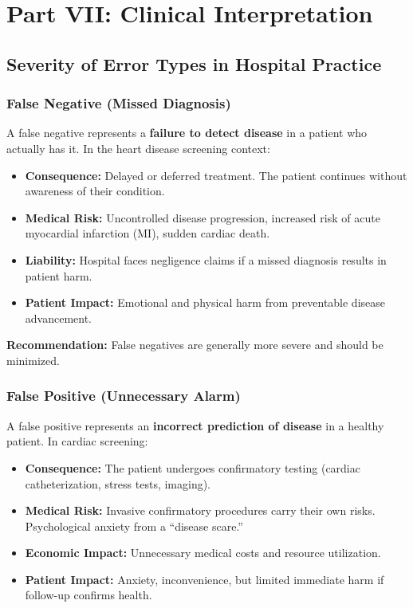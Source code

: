 \documentclass[11pt]{article}
\begin{document}
\newpage

\section{Part VII: Clinical Interpretation}

\subsection{Severity of Error Types in Hospital Practice}

\subsubsection{False Negative (Missed Diagnosis)}

A false negative represents a \textbf{failure to detect disease} in a patient who actually has it. In the heart disease screening context:

\begin{itemize}
    \item \textbf{Consequence:} Delayed or deferred treatment. The patient continues without awareness of their condition.
    \item \textbf{Medical Risk:} Uncontrolled disease progression, increased risk of acute myocardial infarction (MI), sudden cardiac death.
    \item \textbf{Liability:} Hospital faces negligence claims if a missed diagnosis results in patient harm.
    \item \textbf{Patient Impact:} Emotional and physical harm from preventable disease advancement.
\end{itemize}

\textbf{Recommendation:} False negatives are generally more severe and should be minimized.

\subsubsection{False Positive (Unnecessary Alarm)}

A false positive represents an \textbf{incorrect prediction of disease} in a healthy patient. In cardiac screening:

\begin{itemize}
    \item \textbf{Consequence:} The patient undergoes confirmatory testing (cardiac catheterization, stress tests, imaging).
    \item \textbf{Medical Risk:} Invasive confirmatory procedures carry their own risks. Psychological anxiety from a ``disease scare.''
    \item \textbf{Economic Impact:} Unnecessary medical costs and resource utilization.
    \item \textbf{Patient Impact:} Anxiety, inconvenience, but limited immediate harm if follow-up confirms health.
\end{itemize}
\end{document}
